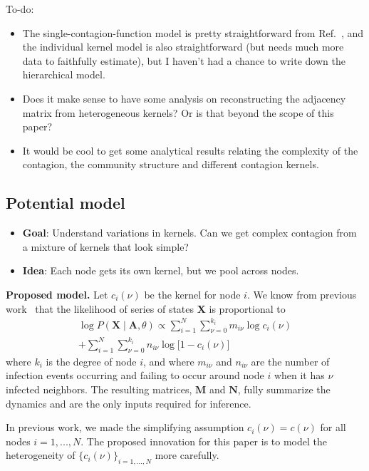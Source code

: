\documentclass[10pt,aps,pre,twocolumn,nopacs,final,letterpaper,superscriptaddress,longbibliography]{revtex4-2}
\begin{document}
To-do:
\begin{itemize}
    \item The single-contagion-function model is pretty straightforward from Ref.~\cite{landry_reconstructing_2024}, and the individual kernel model is also straightforward (but needs much more data to faithfully estimate), but I haven't had a chance to write down the hierarchical model.
    \item Does it make sense to have some analysis on reconstructing the adjacency matrix from heterogeneous kernels? Or is that beyond the scope of this paper?
    \item It would be cool to get some analytical results relating the complexity of the contagion, the community structure and different contagion kernels.
\end{itemize}


\subsection{Potential model}

\begin{itemize}
    \item \textbf{Goal}: Understand variations in kernels. Can we get complex contagion from a mixture of kernels that look simple? 
    \item \textbf{Idea}: Each node gets its own kernel, but we pool across nodes. 
\end{itemize}

\textbf{Proposed model.}
Let $c_i(\nu)$ be the kernel for node $i$.
We know from previous work~\cite{landry_reconstructing_2024} that the likelihood of series of states $\bm{X}$ is proportional to
\begin{multline}
    \log P(\bm{X}\mid \bm{A}, \theta) \propto \sum_{i=1}^N \sum_{\nu=0}^{k_i} m_{i\nu} \log c_i(\nu)\\ +  \sum_{i=1}^N \sum_{\nu=0}^{k_i} n_{i\nu} \log \bigl[1 - c_i(\nu)\bigr]
\end{multline}
where $k_i$ is the degree of node $i$, and where $m_{i\nu}$ and $n_{i\nu}$ are the number of infection events occurring and failing to occur around node $i$ when it has $\nu$ infected neighbors.
The resulting matrices, $\bm{M}$ and $\bm{N}$, fully summarize the dynamics and are the only inputs required for inference.

In previous work, we made the simplifying assumption $c_i(\nu) = c(\nu)$ for all nodes $i=1,...,N$.
The proposed innovation for this paper is to model the heterogeneity of $\{c_i(\nu)\}_{i=1,...,N}$ more carefully.
\end{document}
